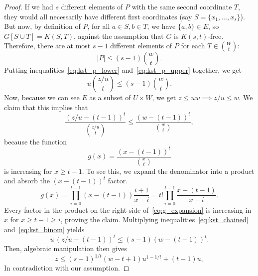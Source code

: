 \begin{theorem}
\begin{proof}
        If we had $s$ different elements of $P$ with the same second coordinate $T$,
        they would all necessarily have different first coordinates
        (say $S = \{x_1, \dots, x_s\}$).
        But now, by definition of $P$, for all $a \in S, b \in T$, we have $\{a, b\} \in E$,
        so $G[S \cup T] = K(S, T)$, against the assumption that $G$ is $K(s, t)$-free.
        Therefore, there are at most $s - 1$ different elements of $P$ for each $T \in \binom{W}{t}$:
        \begin{equation} \label{eq:kst_p_upper}
            |P| \leq (s - 1) \binom{w}{t}.
        \end{equation}
        Putting inequalities~\eqref{eq:kst_p_lower} and~\eqref{eq:kst_p_upper}
        together, we get
        \begin{equation} \label{eq:kst_chained}
            u \binom{z / u}{t} \leq (s - 1) \binom{w}{t}.
        \end{equation}
        Now, because we can see $E$ as a subset of $U \times W$,
        we get $z \leq uw \implies z/u \leq w$.
        We claim that this implies that
        \begin{equation} \label{eq:kst_binom}
            \frac{(z/u - (t - 1))^t}{\binom{z/u}{t}} \leq \frac{(w - (t - 1))^t}{\binom{w}{t}},
        \end{equation}
        because the function
        \[
            g(x) = \frac{(x - (t - 1))^t}{\binom{x}{t}}
        \]
        is increasing for $x \geq t - 1$.
        To see this, we expand the denominator into a product and absorb the $(x - (t - 1))^t$ factor.
        \begin{equation} \label{eq:g_expansion}
            g(x) = \prod_{i=0}^{t-1} (x-(t-1)) \frac{i+1}{x-i} = t! \prod_{i=0}^{t-1} \frac{x-(t-1)}{x-i}.
        \end{equation}
        Every factor in the product on the right side of~\eqref{eq:g_expansion} is increasing
        in $x$ for $x \geq t - 1 \geq i$, proving the claim.
        Multiplying inequalities~\eqref{eq:kst_chained} and~\eqref{eq:kst_binom} yields
        \[
            u \, (z/u - (t - 1))^t \leq (s - 1)(w - (t - 1))^t.
        \]
        Then, algebraic manipulation then gives
        \[
            z \leq (s - 1)^{1 / t}(w - t + 1)u^{1 - 1 / t} + (t - 1)u,
        \]
        In contradiction with our assumption. \qedhere
    \end{proof}

\end{theorem}

